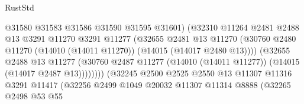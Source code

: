 \begin{lexlean}{RustStd}
\begin{coremodule}
                                          @31580
                                          @31583
                                          @31586
                                          @31590
                                          @31595
                                          @31601)
                                        (@32310
                                          @11264
                                          @2481
                                          @2488
                                          @13
                                          @3291
                                          @11270
                                          @3291
                                          @11277
                                          (@32655
                                            @2481
                                            @13
                                            @11270
                                            (@30760
                                              @2480
                                              @11270
                                              (@14010 (@14011 @11270))
                                              (@14015 (@14017 @2480 @13))))
                                          (@32655
                                            @2488
                                            @13
                                            @11277
                                            (@30760
                                              @2487
                                              @11277
                                              (@14010 (@14011 @11277))
                                              (@14015 (@14017 @2487 @13))))))))
                                  (@32245
                                    @2500
                                    @2525
                                    @2550
                                    @13
                                    @11307
                                    @11316
                                    @3291
                                    @11417
                                    (@32256
                                      @2499
                                      @1049
                                      @20032
                                      @11307
                                      @11314
                                      @8888
                                      (@32265
                                        @2498
                                        @53
                                        @55

\end{coremodule}
\end{lexlean}
